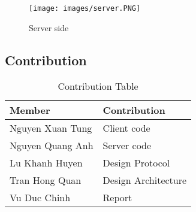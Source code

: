 \documentclass[13pt]{article}
\begin{document}
\begin{figure}[H]
    \centering
    \texttt{[image: images/server.PNG]}
    \caption{Server side}
\end{figure}
\subsection{Contribution}
\noindent%
\begin{table}[ht!]
  \begin{center}
    \label{tab:table1}
    \begin{tabular}{l|l}
      \textbf{Member} & \textbf{Contribution}\\
      \hline
      Nguyen Xuan Tung & Client code\\
      Nguyen Quang Anh & Server code\\
      Lu Khanh Huyen & Design Protocol\\
      Tran Hong Quan & Design Architecture\\
      Vu Duc Chinh & Report\\
    \end{tabular}
    \caption{Contribution Table}
  \end{center}
\end{table}
\end{document}
